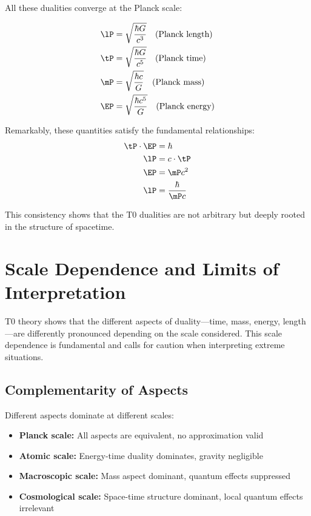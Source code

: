 	All these dualities converge at the Planck scale:
	
	\begin{align}
		\lP &= \sqrt{\frac{\hbar G}{c^3}} \quad \text{(Planck length)} \\
		\tP &= \sqrt{\frac{\hbar G}{c^5}} \quad \text{(Planck time)} \\
		\mP &= \sqrt{\frac{\hbar c}{G}} \quad \text{(Planck mass)} \\
		\EP &= \sqrt{\frac{\hbar c^5}{G}} \quad \text{(Planck energy)}
	\end{align}
	
	Remarkably, these quantities satisfy the fundamental relationships:
	\begin{align}
		\tP \cdot \EP &= \hbar \\
		\lP &= c \cdot \tP \\
		\EP &= \mP c^2 \\
		\lP &= \frac{\hbar}{\mP c}
	\end{align}
	
	This consistency shows that the T0 dualities are not arbitrary but deeply rooted in the structure of spacetime.
	
	\section{Scale Dependence and Limits of Interpretation}
	
	T0 theory shows that the different aspects of duality—time, mass, energy, length—are differently pronounced depending on the scale considered. This scale dependence is fundamental and calls for caution when interpreting extreme situations.
	
	\subsection{Complementarity of Aspects}
	
	Different aspects dominate at different scales:
	\begin{itemize}
		\item \textbf{Planck scale:} All aspects are equivalent, no approximation valid
		\item \textbf{Atomic scale:} Energy-time duality dominates, gravity negligible
		\item \textbf{Macroscopic scale:} Mass aspect dominant, quantum effects suppressed
		\item \textbf{Cosmological scale:} Space-time structure dominant, local quantum effects irrelevant
	\end{itemize}
	
